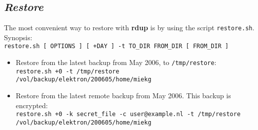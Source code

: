 \documentclass[a4paper, openany]{blocksbook}
\newcommand{\rdup}{\textbf{rdup}}
\newcommand{\cmd}[1]{\texttt{#1}}
\newcommand{\path}[1]{\texttt{#1}}
\begin{document}
\subsection*{\textit{Restore}}
The most convenient way to restore with \rdup{} is by using
the script \cmd{restore.sh}. Synopsis:\\
\cmd{restore.sh [ OPTIONS ] [ +DAY ] -t TO\_DIR FROM\_DIR [ FROM\_DIR ]}
\begin{itemize}
\item
Restore from the latest backup from May 2006, to \path{/tmp/restore}:\\
\cmd{restore.sh +0 -t /tmp/restore \\
/vol/backup/elektron/200605/home/miekg}
\item
Restore from the latest remote backup from May 2006. This backup
is encrypted:\\
\cmd{restore.sh +0 -k secret\_file -c user@example.nl -t /tmp/restore \\
/vol/backup/elektron/200605/home/miekg}
\end{itemize}
\end{document}
